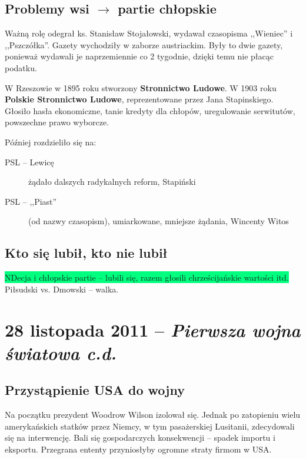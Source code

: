 \documentclass [a4paper, 11pt, oneside]{book}
\begin{document}
    \section{Problemy wsi $\mathbf{\rightarrow}$ partie chłopskie} %
    \label{sec:problemy_wsi_mathbf}
        Ważną rolę odegrał ks. Stanisław Stojałowski, wydawał czasopisma ,,Wieniec'' i ,,Pszczółka''. Gazety wychodziły w zaborze austriackim. Były to dwie gazety, ponieważ wydawali je naprzemiennie co 2 tygodnie, dzięki temu nie płacąc podatku.

        W Rzeszowie w 1895 roku stworzony \textbf{Stronnictwo Ludowe}. W 1903 roku \textbf{Polskie Stronnictwo Ludowe}, reprezentowane przez Jana Stapinskiego. Głosiło hasła ekonomiczne, tanie kredyty dla chłopów, uregulowanie serwitutów, powszechne prawo wyborcze.

        Później rozdzieliło się na:
        \begin{description}
             \item[PSL -- Lewicę] żądało dalszych radykalnych reform, Stapiński
             \item[PSL -- ,,Piast''] (od nazwy czasopism), umiarkowane, mniejsze żądania, Wincenty Witos
         \end{description}
    \section{Kto się lubił, kto nie lubił} %
    \label{sec:kto_si_lubi_kto_nie_lubi_}
        \colorbox{SpringGreen}{NDecja i chłopskie partie -- lubili się, razem głosili chrześcijańskie wartości itd.}\\
        \colorbox{WildStrawberry}{Piłsudski vs. Dmowski -- walka.}
\chapter{28 listopada 2011 -- \textit{Pierwsza wojna światowa c.d.}} %
\label{cha:pierwsza_wojna_wiatowa_c_d_}
    \section{Przystąpienie USA do wojny} %
    \label{sec:przyst_pienie_usa_do_wojny}
        Na początku prezydent Woodrow Wilson izolował się. Jednak po zatopieniu wielu amerykańskich statków przez Niemcy, w tym pasażerskiej Lusitanii, zdecydowali się na interwencję. Bali się gospodarczych konsekwencji -- spadek importu i eksportu. Przegrana ententy przyniosłyby ogromne straty firmom w USA.
\end{document}
